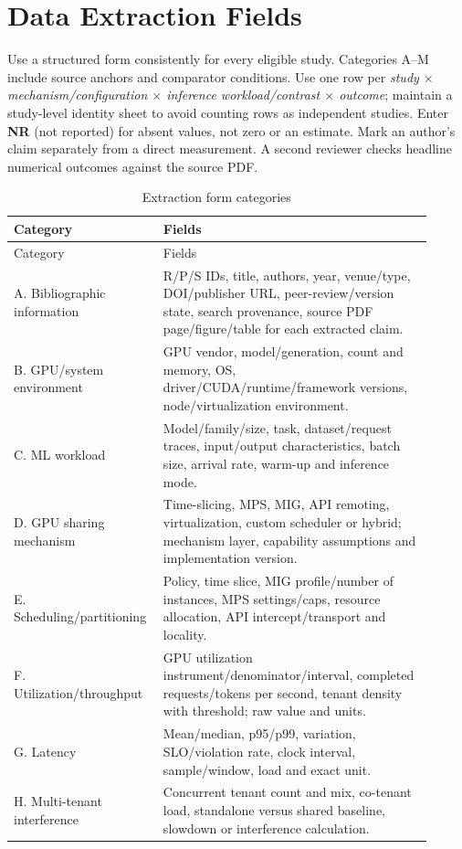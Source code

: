 \documentclass[12pt,a4paper]{article}
\newcommand{\term}[1]{\textbf{#1}}
\begin{document}
\section{Data Extraction Fields}
Use a structured form consistently for every eligible study. Categories A--M include source anchors and comparator conditions. Use one row per \emph{study $\times$ mechanism/configuration $\times$ inference workload/contrast $\times$ outcome}; maintain a study-level identity sheet to avoid counting rows as independent studies. Enter \term{NR} (not reported) for absent values, not zero or an estimate. Mark an author's claim separately from a direct measurement. A second reviewer checks headline numerical outcomes against the source PDF.

\begin{longtable}{p{0.29\linewidth}p{0.62\linewidth}}
\caption{Extraction form categories}\label{tab:extract}\\\toprule Category & Fields\\\midrule\endfirsthead
\toprule Category & Fields\\\midrule\endhead
A. Bibliographic information & R/P/S IDs, title, authors, year, venue/type, DOI/publisher URL, peer-review/version state, search provenance, source PDF page/figure/table for each extracted claim.\\
B. GPU/system environment & GPU vendor, model/generation, count and memory, OS, driver/CUDA/runtime/framework versions, node/virtualization environment.\\
C. ML workload & Model/family/size, task, dataset/request traces, input/output characteristics, batch size, arrival rate, warm-up and inference mode.\\
D. GPU sharing mechanism & Time-slicing, MPS, MIG, API remoting, virtualization, custom scheduler or hybrid; mechanism layer, capability assumptions and implementation version.\\
E. Scheduling/partitioning & Policy, time slice, MIG profile/number of instances, MPS settings/caps, resource allocation, API intercept/transport and locality.\\
F. Utilization/throughput & GPU utilization instrument/denominator/interval, completed requests/tokens per second, tenant density with threshold; raw value and units.\\
G. Latency & Mean/median, p95/p99, variation, SLO/violation rate, clock interval, sample/window, load and exact unit.\\
H. Multi-tenant interference & Concurrent tenant count and mix, co-tenant load, standalone versus shared baseline, slowdown or interference calculation.\\

\end{longtable}
\end{document}
